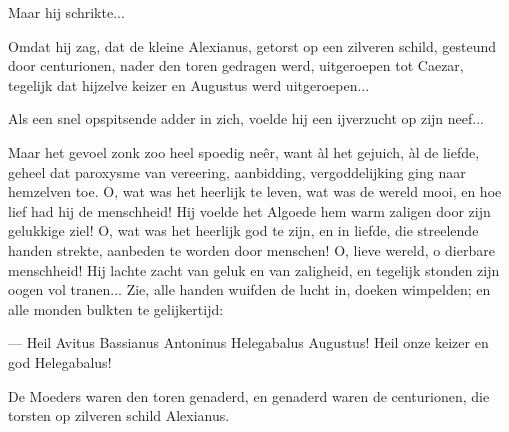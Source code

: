 \documentclass[a4paper, 12pt, oneside, dutch]{article}
\begin{document}
Maar hij schrikte...

Omdat hij zag, dat de kleine Alexianus, getorst op een zilveren schild, gesteund door centurionen, nader den toren gedragen werd, uitgeroepen tot Caezar, tegelijk dat hijzelve keizer en Augustus werd uitgeroepen...

Als een snel opspitsende adder in zich, voelde hij een ijverzucht op zijn neef...

Maar het gevoel zonk zoo heel spoedig neêr, want àl het gejuich, àl de liefde, geheel dat paroxysme van vereering, aanbidding, vergoddelijking ging naar hemzelven toe. O, wat was het heerlijk te leven, wat was de wereld mooi, en hoe lief had hij de menschheid! Hij voelde het Algoede hem warm zaligen door zijn gelukkige ziel! O, wat was het heerlijk god te zijn, en in liefde, die streelende handen strekte, aanbeden te worden door menschen! O, lieve wereld, o dierbare menschheid! Hij lachte zacht van geluk en van zaligheid, en tegelijk stonden zijn oogen vol tranen... Zie, alle handen wuifden de lucht in, doeken wimpelden; en alle monden bulkten te gelijkertijd:

--- Heil Avitus Bassianus Antoninus Helegabalus Augustus! Heil onze keizer en god Helegabalus!

De Moeders waren den toren genaderd, en genaderd waren de centurionen, die torsten op zilveren schild Alexianus.
\end{document}
